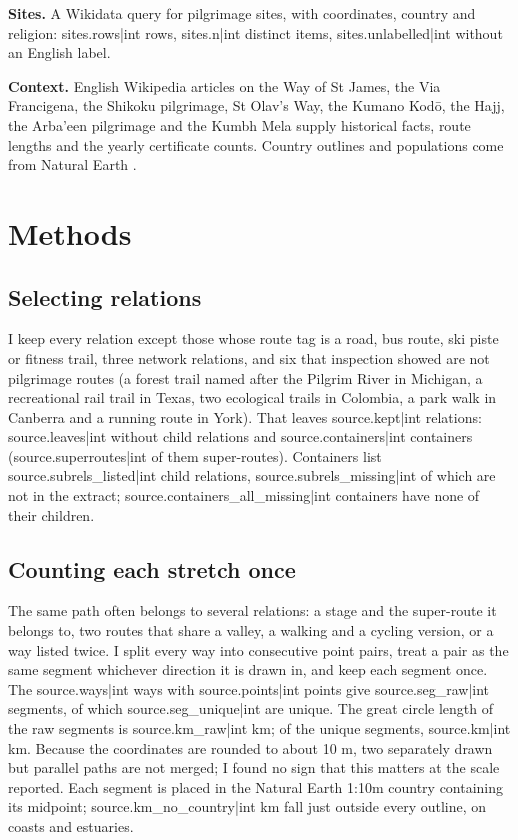\documentclass[11pt,a4paper]{article}
\begin{document}
\textbf{Sites.} A Wikidata query for pilgrimage sites, with coordinates, country and religion: {{sites.rows|int}} rows, {{sites.n|int}} distinct items, {{sites.unlabelled|int}} without an English label.

\textbf{Context.} English Wikipedia articles on the Way of St James, the Via Francigena, the Shikoku pilgrimage, St Olav's Way, the Kumano Kodō, the Hajj, the Arba'een pilgrimage and the Kumbh Mela \citep{wikicamino,wikivf,wikishikoku,wikiolav,wikikumano,wikihajj,wikiarbaeen,wikikumbh} supply historical facts, route lengths and the yearly certificate counts. Country outlines and populations come from Natural Earth \citep{naturalearth}.

\section{Methods}
\subsection{Selecting relations}
I keep every relation except those whose route tag is a road, bus route, ski piste or fitness trail, three network relations, and six that inspection showed are not pilgrimage routes (a forest trail named after the Pilgrim River in Michigan, a recreational rail trail in Texas, two ecological trails in Colombia, a park walk in Canberra and a running route in York). That leaves {{source.kept|int}} relations: {{source.leaves|int}} without child relations and {{source.containers|int}} containers ({{source.superroutes|int}} of them super-routes). Containers list {{source.subrels_listed|int}} child relations, {{source.subrels_missing|int}} of which are not in the extract; {{source.containers_all_missing|int}} containers have none of their children.

\subsection{Counting each stretch once}
The same path often belongs to several relations: a stage and the super-route it belongs to, two routes that share a valley, a walking and a cycling version, or a way listed twice. I split every way into consecutive point pairs, treat a pair as the same segment whichever direction it is drawn in, and keep each segment once. The {{source.ways|int}} ways with {{source.points|int}} points give {{source.seg_raw|int}} segments, of which {{source.seg_unique|int}} are unique. The great circle length of the raw segments is {{source.km_raw|int}} km; of the unique segments, {{source.km|int}} km. Because the coordinates are rounded to about 10 m, two separately drawn but parallel paths are not merged; I found no sign that this matters at the scale reported. Each segment is placed in the Natural Earth 1:10m country containing its midpoint; {{source.km_no_country|int}} km fall just outside every outline, on coasts and estuaries.
\end{document}
